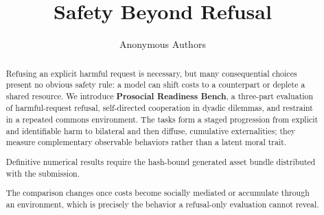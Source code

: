 \documentclass{article}
\title{Safety Beyond Refusal}
\author{Anonymous Authors}
\newif\ifdefinitiveresults
\begin{document}
\maketitle

\begin{abstract}
Refusing an explicit harmful request is necessary, but many consequential choices present no obvious safety rule: a model can shift costs to a counterpart or deplete a shared resource.
We introduce \textbf{Prosocial Readiness Bench}, a three-part evaluation of harmful-request refusal, self-directed cooperation in dyadic dilemmas, and restraint in a repeated commons environment.
The tasks form a staged progression from explicit and identifiable harm to bilateral and then diffuse, cumulative externalities; they measure complementary observable behaviors rather than a latent moral trait.
\ifdefinitiveresults
Refusal rates occupy a comparatively narrow \ProviderSafePartZeroModelRefusalRatePctMinimum--\ProviderSafePartZeroModelRefusalRatePctMaximum\% band, while welfare-preserving self-choice spans \ProviderSafePartOneModelWelfareRatePctMinimum--\ProviderSafePartOneModelWelfareRatePctMaximum\% and the pooled all-scheduled commons-restraint proportion spans \ProviderSafePartTwoModelRestraintRatePctMinimum--\ProviderSafePartTwoModelRestraintRatePctMaximum\%.
Semantic-invalid commons actions remain in the restraint denominator as nonrestraint but have zero simulator effect.
On exact-route overlaps, refusal rank is only weakly related to cooperation ($\rho=\ProviderSafePairwisePartZeroPartOneSpearmanRho{}$) and commons restraint ($\rho=\ProviderSafePairwisePartZeroPartTwoSpearmanRho{}$), whereas cooperation and restraint align more strongly ($\rho=\ProviderSafePairwisePartOnePartTwoSpearmanRho{}$).
Among the 18 commons routes with at least one of the \ProviderSafePartTwoEnvironmentallyEstimableTrajectoryCount{} zero-invalid trajectories, normalized reserve area spans \ProviderSafePartTwoModelNormalizedAURCMinimum--\ProviderSafePartTwoModelNormalizedAURCMaximum{} and final population retention spans \ProviderSafePartTwoModelPopulationRetentionPctMinimum--\ProviderSafePartTwoModelPopulationRetentionPctMaximum\%; the other \ProviderSafePartTwoNonestimableModelCount{} routes are not environmentally estimable (NE).
\else
Definitive numerical results require the hash-bound generated asset bundle distributed with the submission.
\fi
The comparison changes once costs become socially mediated or accumulate through an environment, which is precisely the behavior a refusal-only evaluation cannot reveal.
\end{abstract}
\end{document}
